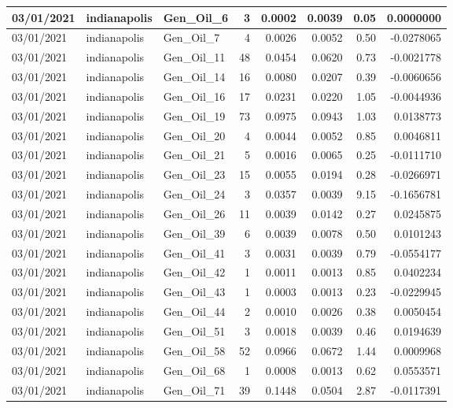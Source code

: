 \documentclass[
  letterpaper,
  DIV=11,
  numbers=noendperiod]{scrartcl}
\begin{document}
\begin{tabular}{l|l|l|r|r|r|r|r}
\hline
03/01/2021 & indianapolis & Gen\_Oil\_6 & 3 & 0.0002 & 0.0039 & 0.05 & 0.0000000\\
\hline
03/01/2021 & indianapolis & Gen\_Oil\_7 & 4 & 0.0026 & 0.0052 & 0.50 & -0.0278065\\
\hline
03/01/2021 & indianapolis & Gen\_Oil\_11 & 48 & 0.0454 & 0.0620 & 0.73 & -0.0021778\\
\hline
03/01/2021 & indianapolis & Gen\_Oil\_14 & 16 & 0.0080 & 0.0207 & 0.39 & -0.0060656\\
\hline
03/01/2021 & indianapolis & Gen\_Oil\_16 & 17 & 0.0231 & 0.0220 & 1.05 & -0.0044936\\
\hline
03/01/2021 & indianapolis & Gen\_Oil\_19 & 73 & 0.0975 & 0.0943 & 1.03 & 0.0138773\\
\hline
03/01/2021 & indianapolis & Gen\_Oil\_20 & 4 & 0.0044 & 0.0052 & 0.85 & 0.0046811\\
\hline
03/01/2021 & indianapolis & Gen\_Oil\_21 & 5 & 0.0016 & 0.0065 & 0.25 & -0.0111710\\
\hline
03/01/2021 & indianapolis & Gen\_Oil\_23 & 15 & 0.0055 & 0.0194 & 0.28 & -0.0266971\\
\hline
03/01/2021 & indianapolis & Gen\_Oil\_24 & 3 & 0.0357 & 0.0039 & 9.15 & -0.1656781\\
\hline
03/01/2021 & indianapolis & Gen\_Oil\_26 & 11 & 0.0039 & 0.0142 & 0.27 & 0.0245875\\
\hline
03/01/2021 & indianapolis & Gen\_Oil\_39 & 6 & 0.0039 & 0.0078 & 0.50 & 0.0101243\\
\hline
03/01/2021 & indianapolis & Gen\_Oil\_41 & 3 & 0.0031 & 0.0039 & 0.79 & -0.0554177\\
\hline
03/01/2021 & indianapolis & Gen\_Oil\_42 & 1 & 0.0011 & 0.0013 & 0.85 & 0.0402234\\
\hline
03/01/2021 & indianapolis & Gen\_Oil\_43 & 1 & 0.0003 & 0.0013 & 0.23 & -0.0229945\\
\hline
03/01/2021 & indianapolis & Gen\_Oil\_44 & 2 & 0.0010 & 0.0026 & 0.38 & 0.0050454\\
\hline
03/01/2021 & indianapolis & Gen\_Oil\_51 & 3 & 0.0018 & 0.0039 & 0.46 & 0.0194639\\
\hline
03/01/2021 & indianapolis & Gen\_Oil\_58 & 52 & 0.0966 & 0.0672 & 1.44 & 0.0009968\\
\hline
03/01/2021 & indianapolis & Gen\_Oil\_68 & 1 & 0.0008 & 0.0013 & 0.62 & 0.0553571\\
\hline
03/01/2021 & indianapolis & Gen\_Oil\_71 & 39 & 0.1448 & 0.0504 & 2.87 & -0.0117391\\

\end{tabular}
\end{document}
